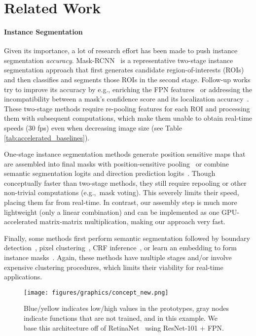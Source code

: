 \documentclass[10pt,journal,compsoc]{IEEEtran}
\begin{document}
\section{Related Work}


\paragraph{Instance Segmentation}
Given its importance, a lot of research effort has been made to push instance segmentation \emph{accuracy}. Mask-RCNN~\cite{maskrcnn} is a representative two-stage instance segmentation approach that first generates candidate region-of-interests (ROIs) and then classifies and segments those ROIs in the second stage. Follow-up works try to improve its accuracy by e.g., enriching the FPN features~\cite{liu-panet2018} or addressing the incompatibility between a mask's confidence score and its localization accuracy~\cite{huang-msrcnn2018}. These two-stage methods require re-pooling features for each ROI and processing them with subsequent computations, which make them unable to obtain real-time speeds (30 fps) even when decreasing image size (see Table \ref{tab:accelerated_baselines}).

One-stage instance segmentation methods generate position sensitive maps that are assembled into final masks with position-sensitive pooling~\cite{dai-eccv2016,fcis} or combine semantic segmentation logits and direction prediction logits~\cite{chen-masklab2018}. Though conceptually faster than two-stage methods, they still require repooling or other non-trivial computations (e.g.,~mask voting). This severely limits their speed, placing them far from real-time. In contrast, our assembly step is much more lightweight (only a linear combination) and can be implemented as one GPU-accelerated matrix-matrix multiplication, making our approach very fast.

Finally, some methods first perform semantic segmentation followed by boundary detection~\cite{kirillov-cvpr2017}, pixel clustering~\cite{bai-cvpr2017,liang-pami2018}, CRF inference~\cite{arnab-cvpr2017}, or learn an embedding to form instance masks~\cite{newell-nips2017,harley-iccv2017,de-arxiv2017,fathi-arxiv2017}. Again, these methods have multiple stages and/or involve expensive clustering procedures, which limits their viability for real-time applications.

    \begin{figure*}
    \centering
\texttt{[image: figures/graphics/concept\_new.png]}
\caption{ Blue/yellow indicates low/high values in the prototypes, gray nodes indicate functions that are not trained, and  in this example. We base this architecture off of RetinaNet~\cite{retinanet} using ResNet-101 + FPN.}
\label{fig:concept}
\end{figure*} 
\end{document}

